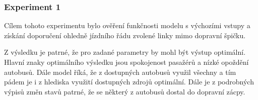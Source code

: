 \documentclass[a4paper]{article}
\begin{document}
            \subsubsection{Experiment 1}
            \label{subsubsec:experiment1}

                Cílem tohoto experimentu bylo ověření funkčnosti modelu s výchozími vstupy a získání doporučení ohledně jízdního řádu zvolené linky mimo dopravní špičku.

                \begin{table}[H]
                    \centering
                    \caption{Výsledek experimentu 1}
                    \label{tab:experiment1}
                \end{table}

				Z výsledku je patrné, že pro zadané parametry by mohl být výstup optimální. Hlavní znaky optimálního výsledku jsou spokojenost pasažérů a nízké opoždění autobusů. Dále model říká, že z dostupných autobusů využil všechny a tím pádem je i z hlediska využití dostupných zdrojů optimální. Dále je z podrobných výpisů změn stavů patrné, že se některý z autobusů dostal do dopravní zácpy.
\end{document}
